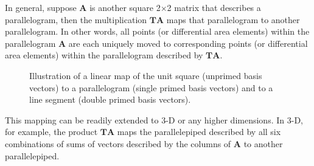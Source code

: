 In general, suppose $\mathbf{A}$ is another square 2$\times$2 matrix that describes a parallelogram, then the multiplication $\mathbf{TA}$ maps that parallelogram to another parallelogram. In other words, all points (or differential area elements) within the parallelogram $\mathbf{A}$ are each uniquely moved to corresponding points (or differential area elements) within the parallelogram described by $\mathbf{TA}$.
 
\begin{figure}[htb!]
\begin{center}
\caption{Illustration of a linear map of the unit square (unprimed basis vectors) to a parallelogram (single primed basis vectors) and to a line segment (double primed basis vectors).}
\label{Fig:linearAlgebra_illustrationOfLinearMap}
\end{center}
\end{figure}

This mapping can be readily extended to 3-D or any higher dimensions. In 3-D, for example, the product $\mathbf{TA}$ maps the parallelepiped described by all six combinations of sums of vectors described by the columns of $\mathbf{A}$ to another parallelepiped.

